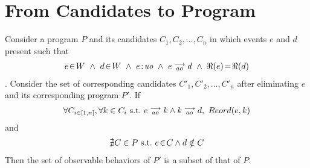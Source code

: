 \section{From Candidates to Program}

    \begin{corollary}
        Consider a program $P$ and its candidates $C_1, C_2, ... , C_n$ in which events $e$ and $d$ present such that 
        \begin{align*}
            \event{e}{W} \ \wedge \ \event{d}{W} \ \wedge \ \et{e}{uo} \ \wedge \ \reln{e}{ao}{d} \ \wedge \ \Re(e)\!=\!\Re(d)
        \end{align*} . 
        Consider the set of corresponding candidates $C'_1, C'_2, ... , C'_n$ after eliminating $e$ and its corresponding program $P'$. If
        \begin{align*}
            \forall C_{i \in [1,n]}, \forall k \in C_i \ \text{s.t.} \ \reln{e}{ao}{k} \wedge \reln{k}{ao}{d}, \    
            Reord(e,k)  
        \end{align*}
        and
        \begin{align*}
            \nexists C \in P \ \text{s.t.} \ e\!\in\!C \wedge d \notin C
        \end{align*}
        Then the set of observable behaviors of $P'$ is a subset of that of $P$.
    \end{corollary}

